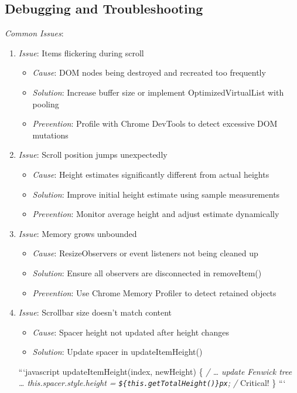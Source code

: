 \documentclass[11pt]{article}
\begin{document}
\subsection{Debugging and Troubleshooting}
\label{sec:org6732ca9}

\emph{Common Issues}:

\begin{enumerate}
\item \emph{Issue}: Items flickering during scroll
\begin{itemize}
\item \emph{Cause}: DOM nodes being destroyed and recreated too frequently
\item \emph{Solution}: Increase buffer size or implement OptimizedVirtualList with pooling
\item \emph{Prevention}: Profile with Chrome DevTools to detect excessive DOM mutations
\end{itemize}

\item \emph{Issue}: Scroll position jumps unexpectedly
\begin{itemize}
\item \emph{Cause}: Height estimates significantly different from actual heights
\item \emph{Solution}: Improve initial height estimate using sample measurements
\item \emph{Prevention}: Monitor average height and adjust estimate dynamically
\end{itemize}

\item \emph{Issue}: Memory grows unbounded
\begin{itemize}
\item \emph{Cause}: ResizeObservers or event listeners not being cleaned up
\item \emph{Solution}: Ensure all observers are disconnected in removeItem()
\item \emph{Prevention}: Use Chrome Memory Profiler to detect retained objects
\end{itemize}

\item \emph{Issue}: Scrollbar size doesn't match content
\begin{itemize}
\item \emph{Cause}: Spacer height not updated after height changes
\item \emph{Solution}: Update spacer in updateItemHeight()
\end{itemize}
```javascript
updateItemHeight(index, newHeight) \{
  \emph{/ \ldots{} update Fenwick tree \ldots{}
  this.spacer.style.height = \texttt{\$\{this.getTotalHeight()\}px}; /} Critical!
\}
```
\end{enumerate}
\end{document}
